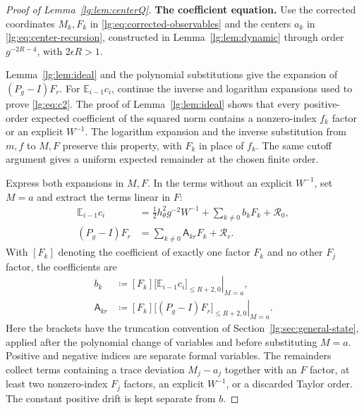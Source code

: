 \documentclass[11pt]{article}
\numberwithin{equation}{section}
\theoremstyle{remark}
\newcommand{\E}{\mathbb E}
\begin{document}
\begin{proof}[Proof of Lemma~\ref{lg:lem:centerQ}]
\noindent\textbf{The coefficient equation.}
Use the corrected coordinates $M_k,F_k$ in
\eqref{lg:eq:corrected-observables} and the centers $a_k$ in
\eqref{lg:eq:center-recursion}, constructed in Lemma~\ref{lg:lem:dynamic}
through order $g^{-2R-4}$, with $2\epsilon R>1$.

Lemma~\ref{lg:lem:ideal} and the polynomial substitutions give
the expansion of $(P_g-I)F_r$. For $\E_{i-1}c_i$, continue the
inverse and logarithm expansions used to prove \eqref{lg:eq:c2}.
The proof of Lemma~\ref{lg:lem:ideal} shows that every positive-order
expected coefficient of the squared norm contains a nonzero-index
$f_k$ factor or an explicit $W^{-1}$. The logarithm expansion and
the inverse substitution from $m,f$ to $M,F$ preserve this property,
with $F_k$ in place of $f_k$. The same cutoff argument gives a
uniform expected remainder at the chosen finite order.

Express both expansions in $M,F$. In the terms without an
explicit $W^{-1}$, set $M=a$ and extract the terms linear in $F$:
\begin{equation}\label{lg:eq:corrector-linear-expansions}
 \begin{aligned}
 \E_{i-1}c_i
 &=\tfrac12h_\theta^2g^{-2}W^{-1}
       +\sum_{k\ne0}b_kF_k+\mathcal R_0,\\
 (P_g-I)F_r&=\sum_{k\ne0}\mathsf A_{kr}F_k+\mathcal R_r.
 \end{aligned}
\end{equation}
With $[F_k]$ denoting the coefficient of exactly one factor
$F_k$ and no other $F_j$ factor, the coefficients are
\begin{equation}\label{lg:eq:Q-coefficients}
 \begin{aligned}
 b_k&\coloneqq[F_k]\left.\bigl[\E_{i-1}c_i\bigr]_{\le R+2,0}\right|_{M=a},\\
 \mathsf A_{kr}&\coloneqq[F_k]\left.\bigl[(P_g-I)F_r\bigr]_{\le R+2,0}\right|_{M=a}.
 \end{aligned}
\end{equation}
Here the brackets have the truncation convention of
Section~\ref{lg:sec:general-state}, applied after the polynomial
change of variables and before substituting $M=a$.
Positive and negative indices are separate formal variables.
The remainders collect terms containing a trace deviation
$M_j-a_j$ together with an $F$ factor, at least two nonzero-index
$F_j$ factors, an explicit $W^{-1}$, or a discarded Taylor order.
The constant positive drift is kept separate from $b$.


\end{proof}
\end{document}

